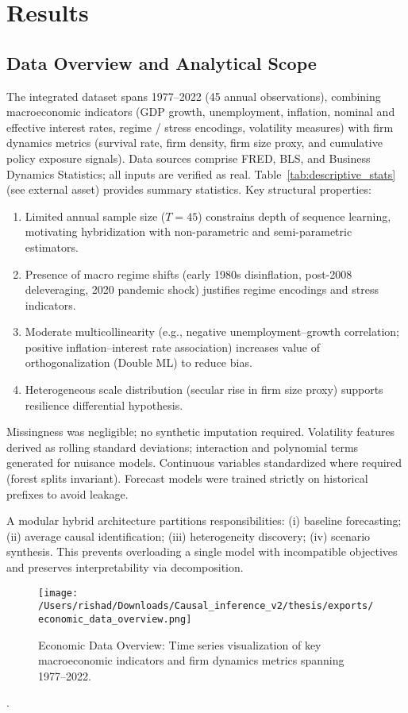 \section{Results}\label{sec:results}

\subsection{Data Overview and Analytical Scope}
The integrated dataset spans 1977--2022 (45 annual observations), combining macroeconomic indicators (GDP growth, unemployment, inflation, nominal and effective interest rates, regime / stress encodings, volatility measures) with firm dynamics metrics (survival rate, firm density, firm size proxy, and cumulative policy exposure signals). Data sources comprise FRED, BLS, and Business Dynamics Statistics; all inputs are verified as real. Table~\ref{tab:descriptive_stats} (see external asset) provides summary statistics. Key structural properties:
\begin{enumerate}
  \item Limited annual sample size ($T=45$) constrains depth of sequence learning, motivating hybridization with non-parametric and semi-parametric estimators.
  \item Presence of macro regime shifts (early 1980s disinflation, post-2008 deleveraging, 2020 pandemic shock) justifies regime encodings and stress indicators.
  \item Moderate multicollinearity (e.g., negative unemployment--growth correlation; positive inflation--interest rate association) increases value of orthogonalization (Double ML) to reduce bias.
  \item Heterogeneous scale distribution (secular rise in firm size proxy) supports resilience differential hypothesis.
\end{enumerate}
Missingness was negligible; no synthetic imputation required. Volatility features derived as rolling standard deviations; interaction and polynomial terms generated for nuisance models. Continuous variables standardized where required (forest splits invariant). Forecast models were trained strictly on historical prefixes to avoid leakage.

A modular hybrid architecture partitions responsibilities: (i) baseline forecasting; (ii) average causal identification; (iii) heterogeneity discovery; (iv) scenario synthesis. This prevents overloading a single model with incompatible objectives and preserves interpretability via decomposition.
\begin{figure}[H]
\centering
\texttt{[image: /Users/rishad/Downloads/Causal\_inference\_v2/thesis/exports/economic\_data\_overview.png]}
\caption{Economic Data Overview: Time series visualization of key macroeconomic indicators and firm dynamics metrics spanning 1977--2022.}
\label{fig:economic_data_overview}
\end{figure}
.




